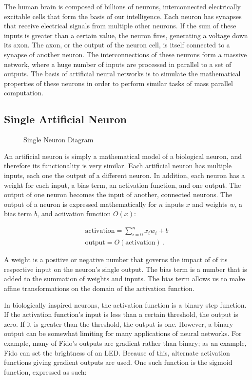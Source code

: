 The human brain is composed of billions of neurons, interconnected electrically excitable cells that form the basis of our intelligence. Each neuron has synapses that receive electrical signals from multiple other neurons. If the sum of these inputs is greater than a certain value, the neuron fires, generating a voltage down its axon. The axon, or the output of the neuron cell, is itself connected to a synapse of another neuron. The interconnections of these neurons form a massive network, where a huge number of inputs are processed in parallel to a set of outputs. The basis of artificial neural networks is to simulate the mathematical properties of these neurons in order to perform similar tasks of mass parallel computation.


\subsection{Single Artificial Neuron}


\begin{figure}[ht]
	\centering
	
	\caption{Single Neuron Diagram}
\end{figure}

An artificial neuron is simply a mathematical model of a biological neuron, and therefore its functionality is very similar. Each artificial neuron has multiple inputs, each one the output of a different neuron. In addition, each neuron has a weight for each input, a bias term, an activation function, and one output. The output of one neuron becomes the input of another, connected neurons. The output of a neuron is expressed mathematically for $n$ inputs $x$ and weights $w$, a bias term $b$, and activation function $O(x)$:

\begin{align*}
	\text{activation} = \sum_{i=0}^{n}x_i w_i + b\\
	\text{output} = O(\text{activation})
	\,.
\end{align*}

A weight is a positive or negative number that governs the impact of of its respective input on the neuron's single output. The bias term is a number that is added to the summation of weights and inputs. The bias term allows us to make affine transformations on the domain of the activation function. 

In biologically inspired neurons, the activation function is a binary step function. If the activation function's input is less than a certain threshold, the output is zero. If it is greater than the threshold, the output is one. However, a binary output can be somewhat limiting for many applications of neural networks. For example, many of Fido's outputs are gradient rather than binary; as an example, Fido can set the brightness of an LED. Because of this, alternate activation functions giving gradient outputs are used. One such function is the sigmoid function, expressed as such:

